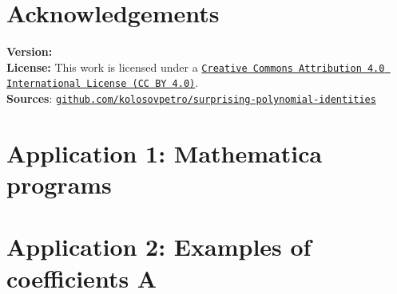 \documentclass[12pt,letterpaper,oneside,reqno]{amsart}
\begin{document}
    \section*{Acknowledgements}
    

    
    

    \noindent \textbf{Version:} 
    \\[1em]
    \noindent \textbf{License:} This work is licensed under a
    \href{https://creativecommons.org/licenses/by/4.0/}
    {\texttt{Creative Commons Attribution 4.0 International License (CC BY 4.0)}}.
    \\[1em]
    \noindent \textbf{Sources}:
    \href{https://github.com/kolosovpetro/unexpected-polynomial-identities-classical-interpolation}
    {\texttt{github.com/kolosovpetro/surprising-polynomial-identities}}

    \clearpage


    \section*{Application 1: Mathematica programs}
    

    \section*{Application 2: Examples of coefficients A}
    


%    
\end{document}
